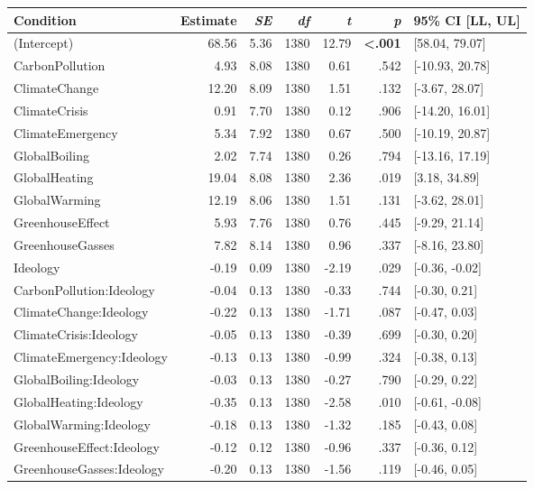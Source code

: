 \begin{table}[ht]
\centering
\begin{tabular}{lrrrrrl}
  \hline
Condition & Estimate & \textit{SE} & \textit{df} & \textit{t} & \textit{p} & 95\% CI [LL, UL] \\ 
  \hline
(Intercept) & 68.56 & 5.36 & 1380 & 12.79 & \textbf{\textless  .001} & [58.04, 79.07] \\ 
  CarbonPollution & 4.93 & 8.08 & 1380 & 0.61 & .542 & [-10.93, 20.78] \\ 
  ClimateChange & 12.20 & 8.09 & 1380 & 1.51 & .132 & [-3.67, 28.07] \\ 
  ClimateCrisis & 0.91 & 7.70 & 1380 & 0.12 & .906 & [-14.20, 16.01] \\ 
  ClimateEmergency & 5.34 & 7.92 & 1380 & 0.67 & .500 & [-10.19, 20.87] \\ 
  GlobalBoiling & 2.02 & 7.74 & 1380 & 0.26 & .794 & [-13.16, 17.19] \\ 
  GlobalHeating & 19.04 & 8.08 & 1380 & 2.36 & .019 & [3.18, 34.89] \\ 
  GlobalWarming & 12.19 & 8.06 & 1380 & 1.51 & .131 & [-3.62, 28.01] \\ 
  GreenhouseEffect & 5.93 & 7.76 & 1380 & 0.76 & .445 & [-9.29, 21.14] \\ 
  GreenhouseGasses & 7.82 & 8.14 & 1380 & 0.96 & .337 & [-8.16, 23.80] \\ 
  Ideology & -0.19 & 0.09 & 1380 & -2.19 & .029 & [-0.36, -0.02] \\ 
  CarbonPollution:Ideology & -0.04 & 0.13 & 1380 & -0.33 & .744 & [-0.30, 0.21] \\ 
  ClimateChange:Ideology & -0.22 & 0.13 & 1380 & -1.71 & .087 & [-0.47, 0.03] \\ 
  ClimateCrisis:Ideology & -0.05 & 0.13 & 1380 & -0.39 & .699 & [-0.30, 0.20] \\ 
  ClimateEmergency:Ideology & -0.13 & 0.13 & 1380 & -0.99 & .324 & [-0.38, 0.13] \\ 
  GlobalBoiling:Ideology & -0.03 & 0.13 & 1380 & -0.27 & .790 & [-0.29, 0.22] \\ 
  GlobalHeating:Ideology & -0.35 & 0.13 & 1380 & -2.58 & .010 & [-0.61, -0.08] \\ 
  GlobalWarming:Ideology & -0.18 & 0.13 & 1380 & -1.32 & .185 & [-0.43, 0.08] \\ 
  GreenhouseEffect:Ideology & -0.12 & 0.12 & 1380 & -0.96 & .337 & [-0.36, 0.12] \\ 
  GreenhouseGasses:Ideology & -0.20 & 0.13 & 1380 & -1.56 & .119 & [-0.46, 0.05] \\ 
   \hline
\end{tabular}
\end{table}
